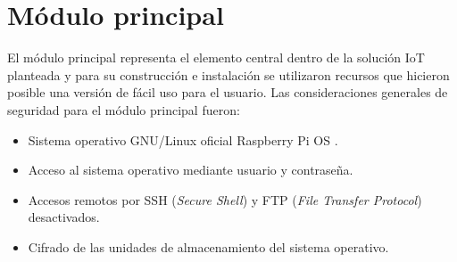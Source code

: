 











\section{Módulo principal}

El módulo principal representa el elemento central dentro de la solución IoT planteada y para  su construcción e instalación se utilizaron recursos que hicieron posible una versión de fácil uso para el usuario. Las consideraciones generales de seguridad para el módulo principal fueron:

\begin{itemize}
\item Sistema operativo GNU/Linux oficial Raspberry Pi OS \citep{WEBSITE:44}\citep{WEBSITE:45}.
\item Acceso al sistema operativo mediante usuario y contraseña.
\item Accesos remotos por SSH (\emph{Secure Shell}) y FTP (\emph{File Transfer Protocol})  desactivados.
\item Cifrado de las unidades de almacenamiento del sistema operativo.
\end{itemize}

